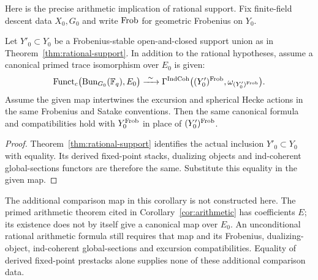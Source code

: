 Here is the precise arithmetic implication of rational support.
Fix finite-field descent data $X_0,G_0$ and write $\operatorname{Frob}$ for geometric
Frobenius on $Y_0$.

\begin{corollary}
\label{cor:rational-arithmetic}
Let $Y'_0\subset Y_0$ be a Frobenius-stable open-and-closed
support union as in Theorem~\ref{thm:rational-support}.
In addition to the rational hypotheses, assume a canonical primed
trace isomorphism over $E_0$ is given:
\[
 \operatorname{Funct}_c\bigl(\operatorname{Bun}_{G_0}(\mathbb F_q),E_0\bigr)
 \xrightarrow{\ \sim\ }
 \Gamma^{\operatorname{IndCoh}}\bigl((Y'_0)^{\operatorname{Frob}},
                              \omega_{(Y'_0)^{\operatorname{Frob}}}\bigr).
\]
Assume the given map intertwines the excursion and spherical Hecke
actions in the same Frobenius and Satake conventions.
Then the same canonical formula and compatibilities hold with
$Y_0^{\operatorname{Frob}}$ in place of $(Y'_0)^{\operatorname{Frob}}$.
\end{corollary}
\begin{proof}
Theorem~\ref{thm:rational-support} identifies the actual inclusion
$Y'_0\subset Y_0$ with equality. Its derived fixed-point stacks,
dualizing objects and ind-coherent global-sections functors are
therefore the same. Substitute this equality in the given map.
\end{proof}

The additional comparison map in this corollary is not constructed
here. The primed arithmetic theorem cited in
Corollary~\ref{cor:arithmetic} has coefficients $E$; its existence
does not by itself give a canonical map over $E_0$. An unconditional
rational arithmetic formula still requires that map and its
Frobenius, dualizing-object, ind-coherent global-sections and excursion
compatibilities. Equality of derived fixed-point prestacks alone
supplies none of these additional comparison data.
